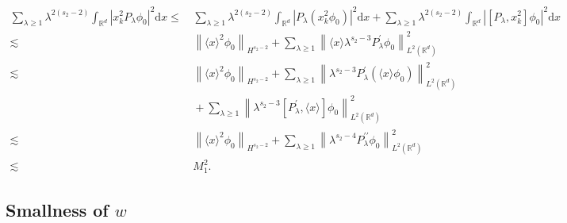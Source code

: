 \documentclass[10pt,twoside,a4paper]{article}
\numberwithin{equation}{section}\allowdisplaybreaks
\def\leq{\leqslant}
\def\geq{\geqslant}
\begin{document}
	\begin{align*}
		\sum_{\lambda\geq 1} \lambda^{2(s_2-2)} \int_{\mathbb{R}^{d}} \left| x_k^2P_{\lambda}\phi_0\right|^2 \mathrm{d} x  \leq& \,  \sum_{\lambda\geq 1} \lambda^{2(s_2-2)} \int_{\mathbb{R}^{d}} \left|P_{\lambda} (x_k^2\phi_0)\right|^2 \mathrm{d} x + \sum_{\lambda\geq 1} \lambda^{2(s_2-2)} \int_{\mathbb{R}^{d}} \left|  [P_{\lambda},x_k^2]\phi_0\right|^2 \mathrm{d} x  \\
		\lesssim &\,   \left\| \langle x\rangle ^2 \phi_0 \right\|_{H^{s_2-2}}+ \sum_{\lambda\geq 1} \left\|\langle x\rangle \lambda^{s_2-3}P_\lambda^\prime \phi_0\right\|_{L^{2}(\mathbb{R}^d)}^2 \\
		\lesssim &\, \left\| \langle x\rangle ^2 \phi_0 \right\|_{H^{s_2-2}}+ \sum_{\lambda\geq 1} \left\| \lambda^{s_2-3}P_\lambda^\prime(\langle x\rangle  \phi_0)\right\|_{L^{2}(\mathbb{R}^d)}^2\\
		&\,+  \sum_{\lambda\geq 1} \left\| \lambda^{s_2-3} [ P_\lambda^\prime,\langle x\rangle ] \phi_0\right\|_{L^{2}(\mathbb{R}^d)}^2 \\
		\lesssim& \,  \left\| \langle x\rangle ^2 \phi_0 \right\|_{H^{s_2-2}} + \sum_{\lambda\geq 1} \left\| \lambda^{s_2-4} P_\lambda^{\prime \prime}  \phi_0\right\|_{L^{2}(\mathbb{R}^d)}^2 \\
		\lesssim&\, M_1^2.
	\end{align*}
	
	
	
	
	
	
	\subsection{Smallness of \texorpdfstring{$w$}{w}} \label{s_big.3}
	
\end{document}
